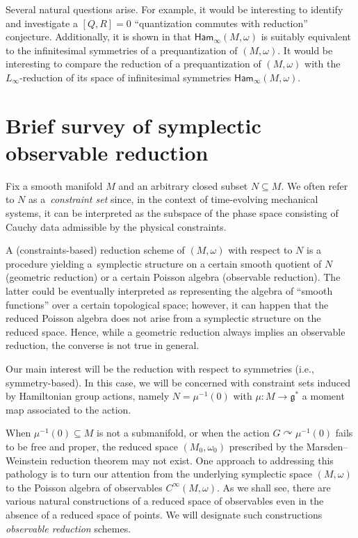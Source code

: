 \documentclass[pdftex]{sigma}
\numberwithin{equation}{section}
\newcommand{\Ham}{\mathsf{Ham}}
\renewcommand{\subset}{\subseteq}
\begin{document}
Several natural questions arise. For example, it would be interesting to identify and investigate a $[Q,R]=0$ ``quantization commutes with reduction'' conjecture. Additionally, it is shown in \cite{FiorenzaRogersSchreiber14} that $\Ham_\infty(M,\omega)$ is suitably equivalent to the infinitesimal symmetries of a prequantization of $(M,\omega)$. It would be interesting to compare the reduction of a prequantization of $(M,\omega)$ with the $L_\infty$-reduction of its space of infinitesimal symmetries $\Ham_\infty(M,\omega)$.

\appendix

\section{Brief survey of symplectic observable reduction}\label{Sec:SymSingRed}

Fix a smooth manifold $M$ and an arbitrary closed subset $N\subset M$.
We often refer to $N$ as a~\emph{constraint set} since, in the context of time-evolving mechanical systems, it can be interpreted as the subspace of the phase space consisting of Cauchy data admissible by the physical constraints.

A (constraints-based) reduction scheme of  $(M,\omega)$  with respect to $N$ is a procedure yielding a~symplectic structure on a certain smooth quotient of $N$ (geometric reduction) or a certain Poisson algebra (observable reduction).
The latter could be eventually interpreted as representing the algebra of ``smooth functions'' over a certain topological space; however, it can happen that the reduced Poisson algebra does not arise from a symplectic structure on the reduced space.
Hence,  while a geometric reduction always implies an observable reduction, the converse is not true in general.

Our main interest will be the reduction with respect to symmetries (i.e., symmetry-based). In this case, we will be concerned with constraint sets induced by Hamiltonian group actions, namely $N=\mu^{-1}(0)$ with $\mu\colon M\to \mathfrak{g}^\ast $ a moment map associated to the action.

When $\mu^{-1}(0)\subset M$ is not a submanifold, or when the action $G\curvearrowright\mu^{-1}(0)$ fails to be free and proper, the reduced space $(M_0,\omega_0)$ prescribed by the Marsden--Weinstein reduction theorem may not exist.
%
One approach to addressing this pathology is to turn our attention from the underlying symplectic space $(M,\omega)$ to the Poisson algebra of observables $C^\infty(M,\omega)$. As we shall see, there are various natural constructions of a reduced space of observables even in the absence of a reduced space of points. We will designate such constructions \emph{observable reduction} schemes.
\end{document}
